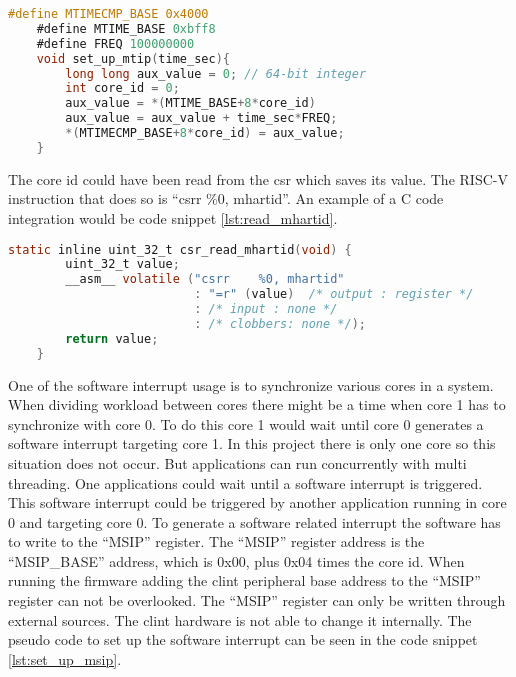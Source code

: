 \begin{lstlisting}[language=C, caption={Set Up Timer Interrupt.}, label=lst:set_up_mtip]
    #define MTIMECMP_BASE 0x4000
    #define MTIME_BASE 0xbff8
    #define FREQ 100000000
    void set_up_mtip(time_sec){
        long long aux_value = 0; // 64-bit integer
        int core_id = 0;
        aux_value = *(MTIME_BASE+8*core_id)
        aux_value = aux_value + time_sec*FREQ;
        *(MTIMECMP_BASE+8*core_id) = aux_value;
    }
\end{lstlisting}

The core id could have been read from the \acrshort{csr} which saves its value. The RISC-V instruction that does so is \enquote{csrr    \%0, mhartid}. An example of a C code integration would be code snippet \ref*{lst:read_mhartid}.

\begin{lstlisting}[language=C, caption={Read core id from \acrshort{csr}.}, label=lst:read_mhartid]
    static inline uint_32_t csr_read_mhartid(void) {
        uint_32_t value;        
        __asm__ volatile ("csrr    %0, mhartid" 
                          : "=r" (value)  /* output : register */
                          : /* input : none */
                          : /* clobbers: none */);
        return value;
    }
\end{lstlisting}

One of the software interrupt usage is to synchronize various cores in a system. When dividing workload between cores there might be a time when core 1 has to synchronize with core 0. To do this core 1 would wait until core 0 generates a software interrupt targeting core 1. In this project there is only one core so this situation does not occur. But applications can run concurrently with multi threading. One applications could wait until a software interrupt is triggered. This software interrupt could be triggered by another application running in core 0 and targeting core 0. To generate a software related interrupt the software has to write to the \enquote{MSIP} register. The \enquote{MSIP} register address is the \enquote{MSIP\_BASE} address, which is 0x00, plus 0x04 times the core id. When running the firmware adding the \acrshort{clint} peripheral base address to the \enquote{MSIP} register can not be overlooked. The \enquote{MSIP} register can only be written through external sources. The \acrshort{clint} hardware is not able to change it internally. The pseudo code to set up the software interrupt can be seen in the code snippet \ref*{lst:set_up_msip}. 

